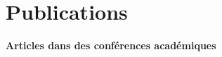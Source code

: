 \documentclass[]{cv-style}          %
\begin{document}





\section{Publications}
 \vspace{-0.2cm}
\large{\textbf{Articles dans des conférences académiques}}
\end{document}
